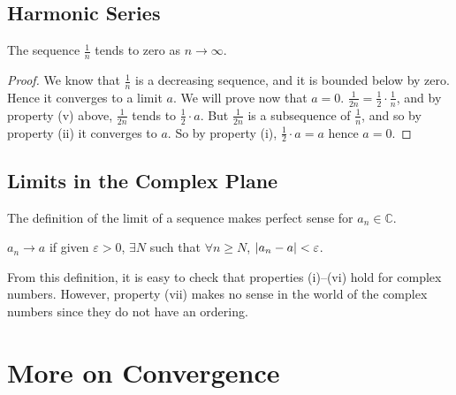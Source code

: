 \documentclass{article}
\begin{document}
\subsection{Harmonic Series}
\begin{lemma}
    The sequence $\frac{1}{n}$ tends to zero as $n \to \infty$.
\end{lemma}
\begin{proof}
    We know that $\frac{1}{n}$ is a decreasing sequence, and it is bounded below by zero. Hence it converges to a limit $a$. We will prove now that $a = 0$. $\frac{1}{2n} = \frac{1}{2}\cdot \frac{1}{n}$, and by property (v) above, $\frac{1}{2n}$ tends to $\frac{1}{2}\cdot a$. But $\frac{1}{2n}$ is a subsequence of $\frac{1}{n}$, and so by property (ii) it converges to $a$. So by property (i), $\frac{1}{2} \cdot a = a$ hence $a=0$.
\end{proof}

\subsection{Limits in the Complex Plane}
\begin{remark}
    The definition of the limit of a sequence makes perfect sense for $a_n \in \mathbb C$.
\end{remark}
\begin{definition}
    $a_n \to a$ if given $\varepsilon > 0$, $\exists N$ such that $\forall n \geq N$, $\abs{a_n - a} < \varepsilon$.
\end{definition}
From this definition, it is easy to check that properties (i)--(vi) hold for complex numbers. However, property (vii) makes no sense in the world of the complex numbers since they do not have an ordering.

\section{More on Convergence}
\end{document}
